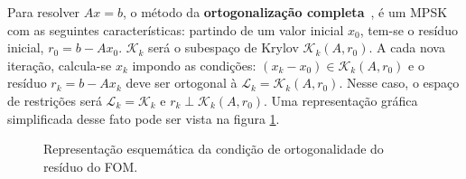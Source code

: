 Para resolver $Ax=b$, o método da \textbf{ortogonalização completa}~\cite{Saad1981Krylov}, \cite{Saad03Iterative} é um MPSK com as seguintes características:  partindo de um valor inicial $x_0$, tem-se o  resíduo inicial, $r_0=b-Ax_0$. $\mathcal{K}_k$ será o subespaço de Krylov $\mathcal{K}_k(A,r_0)$. A cada nova iteração, calcula-se $x_k$  impondo as condições: $(x_k-x_0)\in \mathcal{K}_k(A,r_0)$ e o  resíduo $r_k=b-Ax_k$ deve ser ortogonal à $\mathcal{L}_k=\mathcal{K}_k(A,r_0)$. Nesse caso, o espaço de restrições será $\mathcal{L}_k=\mathcal{K}_k$ e $r_k\perp \mathcal{K}_k(A,r_0)$. Uma representação gráfica simplificada desse fato pode ser vista na figura \ref{fig_kryakrybfom}.

\begin{figure}[htb]
  \caption{Representação esquemática da condição de ortogonalidade do  resíduo do FOM.}\label{fig_kryakrybfom}
\end{figure}

